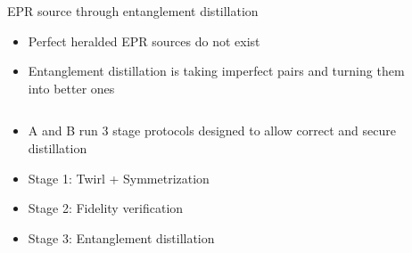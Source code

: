 \documentclass[final]{beamer}
\newlength{\sepwid}
\newlength{\onecolwid}
\newlength{\twocolwid}
\begin{document}
\begin{frame}[t]
\begin{columns}[t]
\begin{column}{\twocolwid}
\begin{columns}[t,totalwidth=\twocolwid]
\begin{column}{\onecolwid}\vspace{-.6in} %





\end{column} %

\end{columns} %



\end{column} %

\begin{column}{\sepwid}\end{column} %

\begin{column}{\twocolwid} %


\begin{block}{EPR source through entanglement distillation}

\begin{itemize}
    \item Perfect heralded EPR sources do not exist
    \item Entanglement distillation is taking imperfect pairs and turning them into better ones
\end{itemize}

\begin{columns}
    \begin{column}{.60\textwidth}
       \begin{itemize}
          \item A and B run 3 stage protocols designed to allow correct and secure distillation \cite{Pirker_2017}
          \item Stage 1: Twirl + Symmetrization
          \item Stage 2: Fidelity verification
          \item Stage 3: Entanglement distillation 
        \end{itemize}
    \end{column}%
    \hfill%
    

\end{columns}
\end{block}
\end{column}
\end{columns}
\end{frame}
\end{document}
